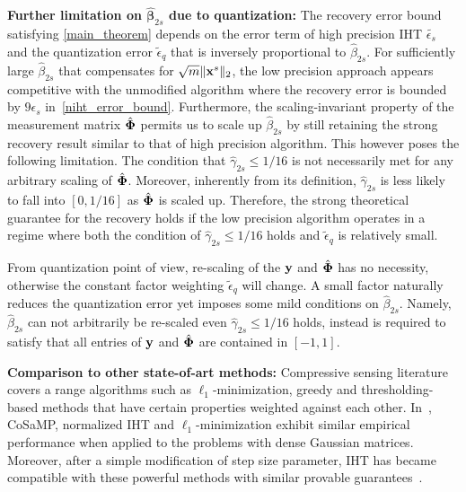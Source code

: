 \documentclass{article}
\begin{document}
{\bf Further limitation on $\hat{\boldsymbol{\beta}}_{2s}$ due to quantization:} The recovery error bound satisfying \ref{main_theorem} depends on the error term of high precision IHT $\tilde{\epsilon_s}$ and the quantization error $\tilde{\epsilon}_q$ that is inversely proportional to $\hat{\beta}_{2s}$. For sufficiently large $\hat{\beta}_{2s}$ that compensates for $\sqrt{m} \|{\bf x}^s \|_2$, the low precision approach appears competitive with the unmodified algorithm where the recovery error is bounded by $9\epsilon_s$ in~\ref{niht_error_bound}. Furthermore, the scaling-invariant property of the measurement matrix $\hat{\bf \Phi}$ permits us to scale up $\hat{\beta}_{2s}$ by still retaining the strong recovery result similar to that of high precision algorithm. This however poses the following limitation. The condition that $\hat{\gamma}_{2s}\leq 1/16$ is not necessarily met for any arbitrary scaling of $\hat{\bf \Phi}$. Moreover, inherently from its definition, $\hat{\gamma}_{2s}$ is less likely to fall into $[0, 1/16]$ as $\hat{\bf \Phi}$ is scaled up. Therefore, the strong theoretical guarantee for the recovery holds if the low precision algorithm operates in a regime where both the condition of $\hat{\gamma}_{2s}\leq 1/16$ holds and $\tilde{\epsilon}_q$ is relatively small.

From quantization point of view, re-scaling of the ${\bf y}$ and $\hat{\bf \Phi}$ has no necessity,
otherwise the constant factor weighting $\tilde{\epsilon}_q$ will change. A small factor naturally reduces the quantization error yet imposes some mild conditions on $\hat{\beta}_{2s}$. Namely, $\hat{\beta}_{2s}$ can not arbitrarily be re-scaled even $\hat{\gamma}_{2s}\leq 1/16$ holds, instead is required to satisfy that all entries of ${\bf y}$ and $\hat{\bf \Phi}$ are contained in $[-1, 1]$.


{\bf Comparison to other state-of-art methods:} Compressive sensing literature covers a range algorithms such as $\ell_1$-minimization, greedy and thresholding-based methods that have certain properties weighted against each other. In~\cite{blumensath2010niht}, CoSaMP, normalized IHT and $\ell_1$-minimization exhibit similar empirical performance when applied to the problems with dense Gaussian matrices. Moreover, after a simple modification of step size parameter, IHT has became compatible with these powerful methods with similar provable guarantees~\cite{blumensath2012greedy}. 
\end{document}
